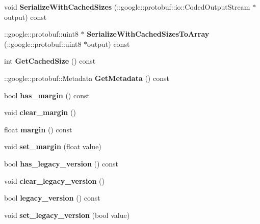 \begin{DoxyCompactItemize}
void {\bfseries Serialize\+With\+Cached\+Sizes} (\+::google\+::protobuf\+::io\+::\+Coded\+Output\+Stream $\ast$output) const
\item 
\mbox{\label{classcaffe_1_1_contrastive_loss_parameter_af12dd0bd86e961777a9b891e2cd3eefa}} 
\+::google\+::protobuf\+::uint8 $\ast$ {\bfseries Serialize\+With\+Cached\+Sizes\+To\+Array} (\+::google\+::protobuf\+::uint8 $\ast$output) const
\item 
\mbox{\label{classcaffe_1_1_contrastive_loss_parameter_abbd2c3a13ffaf793e35d880e1697c355}} 
int {\bfseries Get\+Cached\+Size} () const
\item 
\mbox{\label{classcaffe_1_1_contrastive_loss_parameter_ab303cbccc90c01fa1f554bd098b4e6b5}} 
\+::google\+::protobuf\+::\+Metadata {\bfseries Get\+Metadata} () const
\item 
\mbox{\label{classcaffe_1_1_contrastive_loss_parameter_a7e33a224e727bc6ae962c2a3996806be}} 
bool {\bfseries has\+\_\+margin} () const
\item 
\mbox{\label{classcaffe_1_1_contrastive_loss_parameter_a47087eabc253b2544ecd47f1a100bf35}} 
void {\bfseries clear\+\_\+margin} ()
\item 
\mbox{\label{classcaffe_1_1_contrastive_loss_parameter_a7f5c482f09ea32ab1cbe2cded3dead51}} 
float {\bfseries margin} () const
\item 
\mbox{\label{classcaffe_1_1_contrastive_loss_parameter_adff3d85a13dce0750c14a26834397a35}} 
void {\bfseries set\+\_\+margin} (float value)
\item 
\mbox{\label{classcaffe_1_1_contrastive_loss_parameter_aa58e7a94256972da94b8dac37b9e392d}} 
bool {\bfseries has\+\_\+legacy\+\_\+version} () const
\item 
\mbox{\label{classcaffe_1_1_contrastive_loss_parameter_ad2eabfab55ae218cb97541f88c04314f}} 
void {\bfseries clear\+\_\+legacy\+\_\+version} ()
\item 
\mbox{\label{classcaffe_1_1_contrastive_loss_parameter_aca1f3bb532400a17d5365ad7d5fba1ef}} 
bool {\bfseries legacy\+\_\+version} () const
\item 
\mbox{\label{classcaffe_1_1_contrastive_loss_parameter_ad8b13df62bc061aafcdf74e7cbba64d2}} 
void {\bfseries set\+\_\+legacy\+\_\+version} (bool value)
\end{DoxyCompactItemize}
